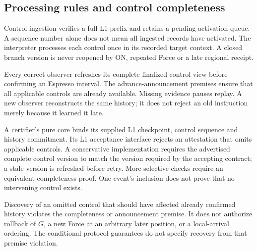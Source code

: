 \subsection{Processing rules and control completeness}
\label{sec:control-completeness}
Control ingestion verifies a full L1 prefix and retains a pending
activation queue. A sequence number alone does not mean all ingested
records have activated. The interpreter processes each control once
in its recorded target context. A closed branch version is never
reopened by ON, repeated Force or a late regional receipt.

Every correct observer refreshes its complete finalized control view
before confirming an Espresso interval. The advance-announcement
premises ensure that all applicable controls are already available.
Missing evidence pauses replay. A new observer reconstructs the same
history; it does not reject an old instruction merely because it
learned it late.

A certifier's pure core binds its supplied L1 checkpoint, control
sequence and history commitment. Its L1 acceptance interface rejects
an attestation that omits applicable controls. A conservative
implementation requires the advertised complete control version to
match the version required by the accepting contract; a stale version
is refreshed before retry. More selective checks require an equivalent
completeness proof. One event's inclusion does not prove that no
intervening control exists.

Discovery of an omitted control that should have affected already
confirmed history violates the completeness or announcement premise.
It does not authorize rollback of $G$, a new Force at an arbitrary
later position, or a local-arrival ordering. The conditional protocol
guarantees do not specify recovery from that premise violation.
